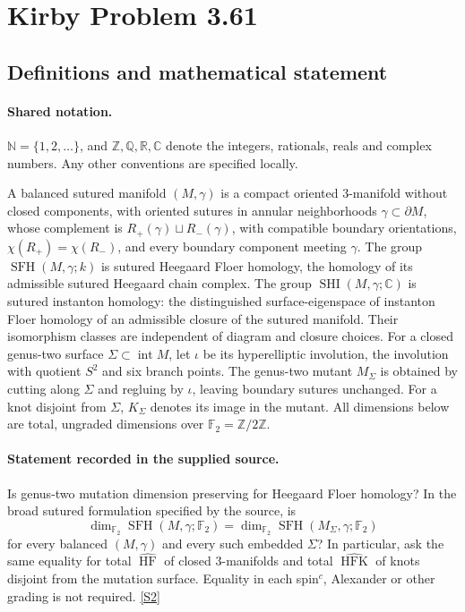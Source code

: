 \documentclass[11pt]{article}
\newcommand{\sref}[2]{\hyperlink{source:#1:#2}{[S#2]}}
\begin{document}
\section{Kirby Problem 3.61}\label{statement}

\subsection{Definitions and mathematical statement}

\paragraph{Shared notation.}$\mathbb N=\{1,2,\ldots\}$, and $\mathbb Z,\mathbb Q,\mathbb R,\mathbb C$ denote the integers, rationals, reals and complex numbers. Any other conventions are specified locally.


A balanced sutured manifold $(M,\gamma)$ is a compact oriented $3$-manifold without closed components, with oriented sutures in annular neighborhoods $\gamma\subset\partial M$, whose complement is $R_+(\gamma)\sqcup R_-(\gamma)$, with compatible boundary orientations, $\chi(R_+)=\chi(R_-)$, and every boundary component meeting $\gamma$. The group $\operatorname{SFH}(M,\gamma;k)$ is sutured Heegaard Floer homology, the homology of its admissible sutured Heegaard chain complex. The group $\operatorname{SHI}(M,\gamma;\mathbb C)$ is sutured instanton homology: the distinguished surface-eigenspace of instanton Floer homology of an admissible closure of the sutured manifold. Their isomorphism classes are independent of diagram and closure choices. For a closed genus-two surface $\Sigma\subset\operatorname{int}M$, let $\iota$ be its hyperelliptic involution, the involution with quotient $S^2$ and six branch points. The genus-two mutant $M_\Sigma$ is obtained by cutting along $\Sigma$ and regluing by $\iota$, leaving boundary sutures unchanged. For a knot disjoint from $\Sigma$, $K_\Sigma$ denotes its image in the mutant. All dimensions below are total, ungraded dimensions over $\mathbb F_2=\mathbb Z/2\mathbb Z$.
\paragraph{Statement recorded in the supplied source.}
Is genus-two mutation dimension preserving for Heegaard Floer homology? In the broad sutured formulation specified by the source, is
\[
\dim_{\mathbb F_2}\operatorname{SFH}(M,\gamma;\mathbb F_2)
=\dim_{\mathbb F_2}\operatorname{SFH}(M_\Sigma,\gamma;\mathbb F_2)
\]
for every balanced $(M,\gamma)$ and every such embedded $\Sigma$? In particular, ask the same equality for total $\widehat{\operatorname{HF}}$ of closed $3$-manifolds and total $\widehat{\operatorname{HFK}}$ of knots disjoint from the mutation surface. Equality in each spin$^c$, Alexander or other grading is not required. \sref{statement}{2}
\end{document}
